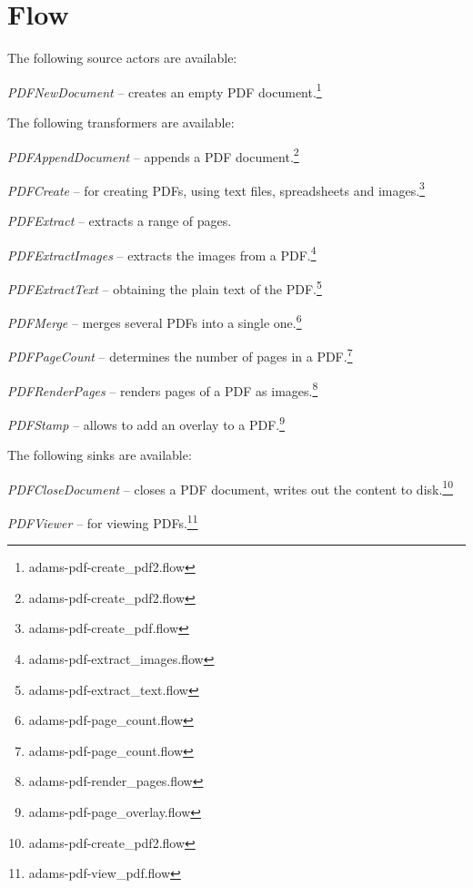 \documentclass[a4paper]{book}
\begin{document}
\chapter{Flow}
The following source actors are available:
\begin{tight_itemize}
	\item \textit{PDFNewDocument} -- creates an empty PDF document.\footnote{adams-pdf-create\_pdf2.flow}
\end{tight_itemize}
The following transformers are available:
\begin{tight_itemize}
	\item \textit{PDFAppendDocument} -- appends a PDF document.\footnote{adams-pdf-create\_pdf2.flow}
	\item \textit{PDFCreate} -- for creating PDFs, using text files,
	spreadsheets and images.\footnote{adams-pdf-create\_pdf.flow}
	\item \textit{PDFExtract} -- extracts a range of pages.
	\item \textit{PDFExtractImages} -- extracts the images from a PDF.\footnote{adams-pdf-extract\_images.flow}
	\item \textit{PDFExtractText} -- obtaining the plain text of the PDF.\footnote{adams-pdf-extract\_text.flow}
	\item \textit{PDFMerge} -- merges several PDFs into a single one.\footnote{adams-pdf-page\_count.flow}
	\item \textit{PDFPageCount} -- determines the number of pages in a
	PDF.\footnote{adams-pdf-page\_count.flow}
	\item \textit{PDFRenderPages} -- renders pages of a PDF as images.\footnote{adams-pdf-render\_pages.flow}
	\item \textit{PDFStamp} -- allows to add an overlay to a PDF.\footnote{adams-pdf-page\_overlay.flow}
\end{tight_itemize}
The following sinks are available:
\begin{tight_itemize}
	\item \textit{PDFCloseDocument} -- closes a PDF document, writes out the content
	to disk.\footnote{adams-pdf-create\_pdf2.flow}
	\item \textit{PDFViewer} -- for viewing PDFs.\footnote{adams-pdf-view\_pdf.flow}
\end{tight_itemize}
\end{document}
